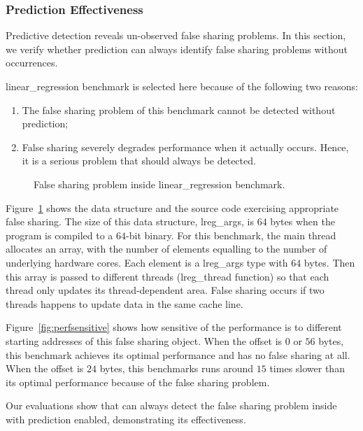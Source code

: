 \subsubsection{Prediction Effectiveness}
\label{sec:predicteval}
Predictive detection reveals un-observed false sharing problems. In this section, we verify whether prediction can always identify false sharing problems without occurrences.

linear\_regression benchmark is selected here because of the following two reasons:
\begin{enumerate}
\item
The false sharing problem of this benchmark cannot be detected without prediction; 
\item
False sharing severely degrades performance when it actually occurs. Hence, it is a serious problem that should always be detected. 
\end{enumerate}

\begin{figure}[!ht]
{\centering
\subfigure{}
\caption{False sharing problem inside linear\_regression benchmark.
\label{fig:linearregression}}
}
\end{figure}

Figure~\ref{fig:linearregression} shows the data structure and the source code exercising appropriate false sharing. The size of this data structure, lreg\_args, is $64$ bytes 
when the program is compiled to a $64$-bit binary. For this benchmark, the main thread allocates an array, with the number of elements equalling to the number of underlying hardware cores. Each element is a lreg\_args type with $64$ bytes. Then this array is passed to different threads (lreg\_thread function) so that each thread only updates its thread-dependent area. False sharing occurs if two threads happens to update data in the same cache line. 

Figure~\ref{fig:perfsensitive} shows how sensitive of the performance is to different starting addresses of this false sharing object. When the offset is $0$ or $56$ bytes, this benchmark achieves its optimal performance and has no false sharing at all. When the offset is $24$ bytes, this benchmarks runs around $15$ times slower than its optimal performance because of the false sharing problem.

Our evaluations show that \Predator{} can always detect the false sharing problem inside with prediction enabled, demonstrating its effectiveness.

